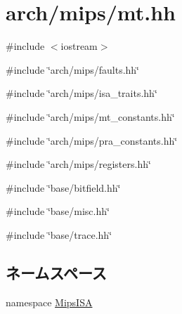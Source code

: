 \hypertarget{mips_2mt_8hh}{
\section{arch/mips/mt.hh}
\label{mips_2mt_8hh}
}
{\ttfamily \#include $<$iostream$>$}\par
{\ttfamily \#include \char`\"{}arch/mips/faults.hh\char`\"{}}\par
{\ttfamily \#include \char`\"{}arch/mips/isa\_\-traits.hh\char`\"{}}\par
{\ttfamily \#include \char`\"{}arch/mips/mt\_\-constants.hh\char`\"{}}\par
{\ttfamily \#include \char`\"{}arch/mips/pra\_\-constants.hh\char`\"{}}\par
{\ttfamily \#include \char`\"{}arch/mips/registers.hh\char`\"{}}\par
{\ttfamily \#include \char`\"{}base/bitfield.hh\char`\"{}}\par
{\ttfamily \#include \char`\"{}base/misc.hh\char`\"{}}\par
{\ttfamily \#include \char`\"{}base/trace.hh\char`\"{}}\par
\subsection*{ネームスペース}
\begin{DoxyCompactItemize}
\item 
namespace \hyperlink{namespaceMipsISA}{MipsISA}
\end{DoxyCompactItemize}
